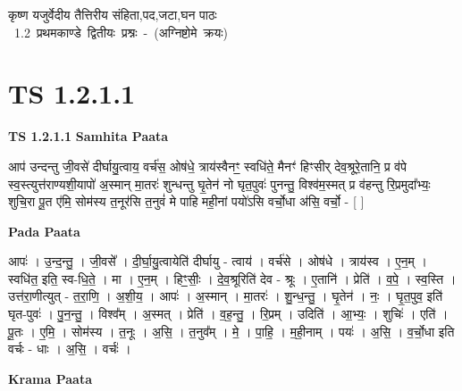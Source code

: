 \documentclass[17pt]{extarticle}
\begin{document}
\begin{titlepage}
    \begin{center}
 
\begin{sanskrit}
    { \Huge
    कृष्ण यजुर्वेदीय तैत्तिरीय संहिता,पद,जटा,घन पाठः 
    }
    \\
    \vspace{2.5cm}
    \mbox{ \Huge
    1.2     प्रथमकाण्डे द्वितीयः प्रश्नः - (अग्निष्टोमे क्रयः)   }
\end{sanskrit}
\end{center}

\end{titlepage}
\tableofcontents
\pagebreak

\section*{ TS 1.2.1.1 }

\textbf{TS 1.2.1.1 } \newline
\textbf{Samhita Paata} \newline

आप॑ उन्दन्तु जी॒वसे॑ दीर्घायु॒त्वाय॒ वर्च॑स॒ ओष॑धे॒ त्राय॑स्वैनꣳ॒॒ स्वधि॑ते॒ मैनꣳ॑ हिꣳसीर् देव॒श्रूरे॒तानि॒ प्र व॑पे स्व॒स्त्युत्त॑राण्यशी॒यापो॑ अ॒स्मान् मा॒तरः॑ शुन्धन्तु घृ॒तेन॑ नो घृत॒पुवः॑ पुनन्तु॒ विश्व॑म॒स्मत् प्र व॑हन्तु रि॒प्रमुदा᳚भ्यः॒ शुचि॒रा पू॒त ए॑मि॒ सोम॑स्य त॒नूर॑सि त॒नुवं॑ मे पाहि मही॒नां पयो॑ऽसि वर्चो॒धा अ॑सि॒ वर्चो॒ - [ ] \newline

\textbf{Pada Paata} \newline

आपः॑ । उ॒न्द॒न्तु॒ । जी॒वसे᳚ । दी॒र्घा॒यु॒त्वायेति॑ दीर्घायु - त्वाय॑ । वर्च॑से । ओष॑धे । त्राय॑स्व । ए॒न॒म् । स्वधि॑त॒ इति॒ स्व-धि॒ते॒ । मा । ए॒न॒म् । हिꣳ॒॒सीः॒ । दे॒व॒श्रूरिति॑ देव - श्रूः । ए॒तानि॑ । प्रेति॑ । व॒पे॒ । स्व॒स्ति । उत्त॑रा॒णीत्युत् - त॒रा॒णि॒ । अ॒शी॒य॒ । आपः॑ । अ॒स्मान् । मा॒तरः॑ । शु॒न्ध॒न्तु॒ । घृ॒तेन॑ । नः॒ । घृ॒त॒पुव॒ इति॑ घृत-पुवः॑ । पु॒न॒न्तु॒ । विश्व᳚म् । अ॒स्मत् । प्रेति॑ । व॒ह॒न्तु॒ । रि॒प्रम् । उदिति॑ । आ॒भ्यः॒ । शुचिः॑ । एति॑ । पू॒तः । ए॒मि॒ । सोम॑स्य । त॒नूः । अ॒सि॒ । त॒नुव᳚म् । मे॒ । पा॒हि॒ । म॒ही॒नाम् । पयः॑ । अ॒सि॒ । व॒र्चो॒धा इति वर्चः - धाः । अ॒सि॒ । वर्चः॑ ।  \newline


\textbf{Krama Paata} \newline
\end{document}
